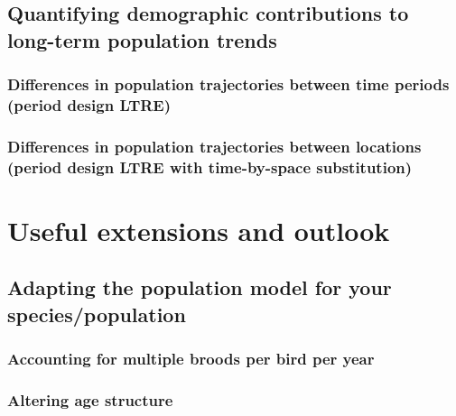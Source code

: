 \documentclass[
]{book}
\begin{document}
\hypertarget{quantifying-demographic-contributions-to-long-term-population-trends}{%
\section{Quantifying demographic contributions to long-term population trends}\label{quantifying-demographic-contributions-to-long-term-population-trends}}

\hypertarget{differences-in-population-trajectories-between-time-periods-period-design-ltre}{%
\subsection{Differences in population trajectories between time periods (period design LTRE)}\label{differences-in-population-trajectories-between-time-periods-period-design-ltre}}

\hypertarget{differences-in-population-trajectories-between-locations-period-design-ltre-with-time-by-space-substitution}{%
\subsection{Differences in population trajectories between locations (period design LTRE with time-by-space substitution)}\label{differences-in-population-trajectories-between-locations-period-design-ltre-with-time-by-space-substitution}}

\hypertarget{ExtOutlook}{%
\chapter{Useful extensions and outlook}\label{ExtOutlook}}

\hypertarget{adapting-the-population-model-for-your-speciespopulation}{%
\section{Adapting the population model for your species/population}\label{adapting-the-population-model-for-your-speciespopulation}}

\hypertarget{accounting-for-multiple-broods-per-bird-per-year}{%
\subsection{Accounting for multiple broods per bird per year}\label{accounting-for-multiple-broods-per-bird-per-year}}

\hypertarget{altering-age-structure}{%
\subsection{Altering age structure}\label{altering-age-structure}}
\end{document}
